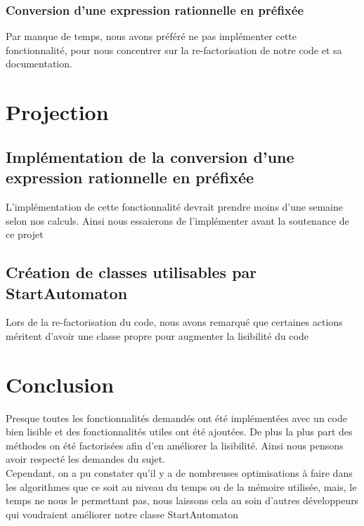 \documentclass[a4paper, 12pt]{report}
\begin{document}
\subsubsection{Conversion d'une expression rationnelle en préfixée}
Par manque de temps, nous avons préféré ne pas implémenter cette fonctionnalité, pour nous concentrer sur la re-factorisation de notre code et sa documentation.



\newpage
\section{Projection}
\subsection{Implémentation de la conversion d'une expression rationnelle en préfixée}
L'implémentation de cette fonctionnalité devrait prendre moins d'une semaine selon nos calculs. Ainsi nous essaierons de l'implémenter avant la soutenance de ce projet

\subsection{Création de classes utilisables par StartAutomaton}
Lors de la re-factorisation du code, nous avons remarqué que certaines actions méritent d'avoir une classe propre pour augmenter la lisibilité du code



\section{Conclusion}
Presque toutes les fonctionnalités demandés ont été implémentées avec un code bien lisible et des fonctionnalités utiles ont été ajoutées. De plus la plus part des méthodes on été factorisées afin d'en améliorer la lisibilité. Ainsi nous pensons avoir respecté les demandes du sujet.\\
Cependant, on a pu constater qu'il y a de nombreuses optimisations à faire dans les algorithmes que ce soit au niveau du temps ou de la mémoire utilisée, mais, le temps ne nous le permettant pas, nous laissons cela au soin d'autres développeurs qui voudraient améliorer notre classe StartAutomaton
	
\end{document}
